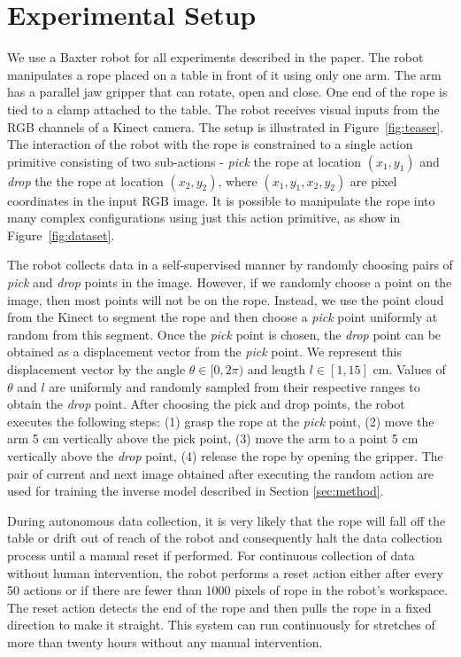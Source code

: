 \documentclass[letterpaper, 10 pt, conference]{ieeeconf}  %
\begin{document}
\section{Experimental Setup}

We use a Baxter robot for all experiments described in the paper. The robot manipulates a rope placed on a table in front of it using only one arm.
The arm has a parallel jaw gripper that can rotate, open and close. One end of the rope is tied to a clamp attached to the table. The robot receives visual inputs from the RGB channels of a Kinect camera. The setup is illustrated in Figure~\ref{fig:teaser}. The interaction of the robot with the rope is constrained to a single action primitive consisting of two sub-actions - \textit{pick} the rope at location $(x_1,y_1)$ and \textit{drop} the the rope at location $(x_2, y_2)$, where $(x_1, y_1, x_2, y_2)$ are pixel coordinates in the input RGB image. It is possible to manipulate the rope into many complex configurations using just this action primitive, as show in Figure~\ref{fig:dataset}.

The robot collects data in a self-supervised manner by randomly choosing pairs of \textit{pick} and \textit{drop} points in the image. However, if we randomly choose a point on the image, then most points will not be on the rope. Instead, we use the point cloud from the Kinect to segment the rope and then choose a \textit{pick} point uniformly at random from this segment.
Once the \textit{pick} point is chosen, the \textit{drop} point can be obtained as a displacement vector from the \textit{pick} point. We represent this displacement vector by the angle $\theta \in [0, 2\pi)$ and length $l \in [1, 15]$ cm. Values of $\theta$ and $l$ are uniformly and randomly sampled from their respective ranges to obtain the \textit{drop} point.
After choosing the pick and drop points, the robot executes the following steps: (1) grasp the rope at the \textit{pick} point, (2) move the arm 5 cm vertically above the pick point, (3) move the arm to a point 5 cm vertically above the \textit{drop} point, (4) release the rope by opening the gripper. The pair of current and next image obtained after executing the random action are used for training the inverse model described in Section \ref{sec:method}. 

During autonomous data collection, it is very likely that the rope will fall off the table or drift out of reach of the robot and consequently halt the data collection process until a manual reset if performed. For continuous collection of data without human intervention, the robot performs a reset action either after every 50 actions or if there are fewer than 1000 pixels of rope in the robot's workspace.
The reset action detects the end of the rope and then pulls the rope in a fixed direction to make it straight. This system can run continuously for stretches of more than twenty hours without any manual intervention. 
\end{document}
